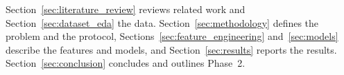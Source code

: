 Section~\ref{sec:literature_review} reviews related work and
Section~\ref{sec:dataset_eda} the data. Section~\ref{sec:methodology} defines the
problem and the protocol, Sections~\ref{sec:feature_engineering}
and~\ref{sec:models} describe the features and models, and
Section~\ref{sec:results} reports the results. Section~\ref{sec:conclusion}
concludes and outlines Phase~2.
